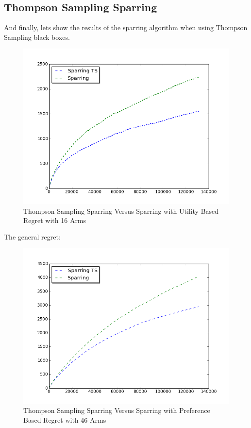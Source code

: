 \documentclass{llncs}
\begin{document}
\subsection{Thompson Sampling Sparring}
And finally, lets show the results of  the sparring algorithm when using Thompson Sampling black boxes.

\begin{figure}[h!]
  \centering
     \includegraphics[scale=0.4, natwidth=410,natheight=442]{figures/TS_sparring_sparring_MQ2007_16arms.png} 
  \caption{Thompson Sampling Sparring Versus Sparring with Utility Based Regret with 16 Arms}
\end{figure}

The general regret:
\begin{figure}[h!]
  \centering
     \includegraphics[scale=0.4, natwidth=410,natheight=442]{figures/TS_sparring_sparring_MQ2007_general.png} 
  \caption{Thompson Sampling Sparring Versus Sparring with Preference Based Regret with 46 Arms}
\end{figure}
\end{document}
